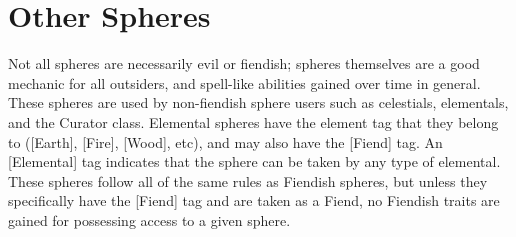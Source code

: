 \section{Other Spheres}

Not all spheres are necessarily evil or fiendish; spheres themselves are a good mechanic for all outsiders, and spell-like abilities gained over time in general. These spheres are used by non-fiendish sphere users such as celestials, elementals, and the Curator class. Elemental spheres have the element tag that they belong to ([Earth], [Fire], [Wood], etc), and may also have the [Fiend] tag. An [Elemental] tag indicates that the sphere can be taken by any type of elemental. These spheres follow all of the same rules as Fiendish spheres, but unless they specifically have the [Fiend] tag and are taken as a Fiend, no Fiendish traits are gained for possessing access to a given sphere.


